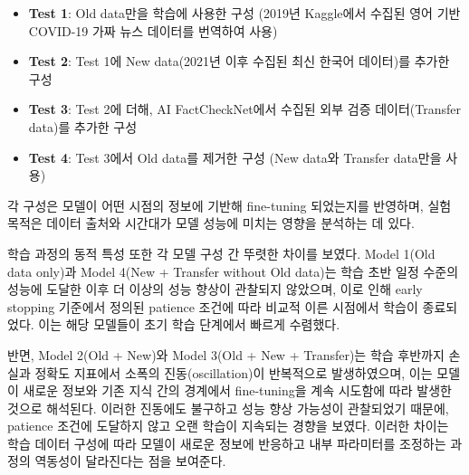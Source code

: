 \documentclass[a4paper,fleqn]{cas-sc}
\begin{document}
\begin{table}[htbp]
    \centering
    \caption{Dataset configurations for transfer learning.}
\end{table}
\begin{itemize}
    \item{\textbf{Test 1}:
    Old data만을 학습에 사용한 구성 (2019년 Kaggle에서 수집된 영어 기반 COVID-19 가짜 뉴스 데이터를 번역하여 사용)}
    \item{\textbf{Test 2}:
    Test 1에 New data(2021년 이후 수집된 최신 한국어 데이터)를 추가한 구성}
    \item{\textbf{Test 3}: 
    Test 2에 더해, AI FactCheckNet에서 수집된 외부 검증 데이터(Transfer data)를 추가한 구성}
    \item{\textbf{Test 4}: 
    Test 3에서 Old data를 제거한 구성 (New data와 Transfer data만을 사용)}
\end{itemize}  

각 구성은 모델이 어떤 시점의 정보에 기반해 fine-tuning 되었는지를 반영하며, 실험 목적은 데이터 출처와 시간대가 모델 성능에 미치는 영향을 분석하는 데 있다. 

학습 과정의 동적 특성 또한 각 모델 구성 간 뚜렷한 차이를 보였다. Model 1(Old data only)과 Model 4(New + Transfer without Old data)는 학습 초반 일정 수준의 성능에 도달한 이후 더 이상의 성능 향상이 관찰되지 않았으며, 이로 인해 early stopping 기준에서 정의된 patience 조건에 따라 비교적 이른 시점에서 학습이 종료되었다. 이는 해당 모델들이 초기 학습 단계에서 빠르게 수렴했다.

반면, Model 2(Old + New)와 Model 3(Old + New + Transfer)는 학습 후반까지 손실과 정확도 지표에서 소폭의 진동(oscillation)이 반복적으로 발생하였으며, 이는 모델이 새로운 정보와 기존 지식 간의 경계에서 fine-tuning을 계속 시도함에 따라 발생한 것으로 해석된다. 이러한 진동에도 불구하고 성능 향상 가능성이 관찰되었기 때문에, patience 조건에 도달하지 않고 오랜 학습이 지속되는 경향을 보였다. 이러한 차이는 학습 데이터 구성에 따라 모델이 새로운 정보에 반응하고 내부 파라미터를 조정하는 과정의 역동성이 달라진다는 점을 보여준다.
\end{document}
